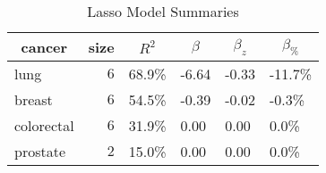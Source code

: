 %
\begin{table}[!tbp]
\caption{Lasso Model Summaries\label{tab:lasso}} 
\begin{center}
\begin{tabular}{lrllll}
\hline\hline
\multicolumn{1}{c}{cancer}&\multicolumn{1}{c}{size}&\multicolumn{1}{c}{$R^2$}&\multicolumn{1}{c}{$\beta$}&\multicolumn{1}{c}{$\beta_z$}&\multicolumn{1}{c}{$\beta_{\%}$}\tabularnewline
\hline
lung&$6$&68.9\%&-6.64&-0.33&-11.7\%\tabularnewline
breast&$6$&54.5\%&-0.39&-0.02&-0.3\%\tabularnewline
colorectal&$6$&31.9\%&0.00&0.00&0.0\%\tabularnewline
prostate&$2$&15.0\%&0.00&0.00&0.0\%\tabularnewline
\hline
\end{tabular}
\end{center}
\end{table}


